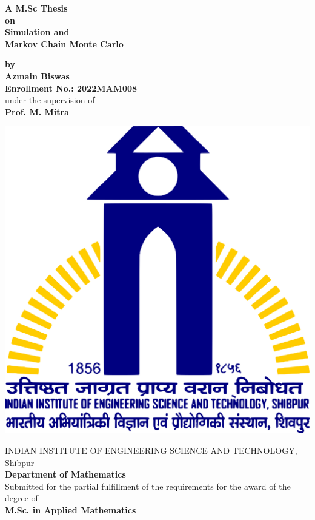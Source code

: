 \begin{titlepage}
    \begin{center}


        \Large{\textbf{A M.Sc Thesis\\ on}}\\
        \huge{\textbf{Simulation and \\ Markov Chain Monte Carlo}}

        \vspace{0.2cm}
        \large{\textbf{by}}\\ 
        \Large{\textbf{Azmain Biswas}}\\ 
        \Large{\textbf{Enrollment No.: 2022MAM008}}\\ 
        \Large{under the supervision of}\\ 
        \Large{\textbf{Prof. M. Mitra}}

        \vspace{1cm}

        \includegraphics[scale = 0.1]{images/IIEST_Shibpur_Logo.svg.png}

        \vspace{0.2cm}

        \Large{{
                INDIAN INSTITUTE OF ENGINEERING SCIENCE AND TECHNOLOGY, Shibpur\\ 
                \textbf{Department of Mathematics}
        }}\\
        \vspace*{0.5cm}
        \large{{Submitted for the partial fulfillment of the requirements for the award of the degree of}}\\
        \Large{\textbf{M.Sc. in Applied Mathematics}}
    \end{center}
\end{titlepage}
